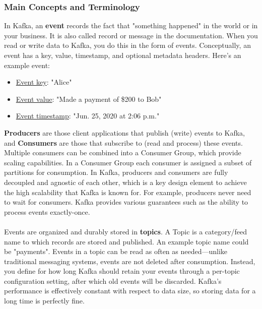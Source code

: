\documentclass[10pt,a4paper]{article}
\newcommand{\nline}{\\~\\}
\begin{document}
\subsubsection{Main Concepts and Terminology}
In Kafka, an \textbf{event} records the fact that "something happened" in the world or in your business. It is also called record or message in the documentation. When you read or write data to Kafka, you do this in the form of events. Conceptually, an event has a key, value, timestamp, and optional metadata headers. Here's an example event:
\begin{itemize}
	\item \uline{Event key}: "Alice"
	\item \uline{Event value}: "Made a payment of \$200 to Bob"
	\item \uline{Event timestamp}: "Jun. 25, 2020 at 2:06 p.m."
\end{itemize}
\textbf{Producers} are those client applications that publish (write) events to Kafka, and \textbf{Consumers} are those that subscribe to (read and process) these events. Multiple consumers can be combined into a Consumer Group, which provide scaling capabilities. In a Consumer Group each consumer is assigned a subset of partitions for consumption. In Kafka, producers and consumers are fully decoupled and agnostic of each other, which is a key design element to achieve the high scalability that Kafka is known for. For example, producers never need to wait for consumers. Kafka provides various guarantees such as the ability to process events exactly-once.
\nline
Events are organized and durably stored in \textbf{topics}. A Topic is a category/feed name to which records are stored and published. An example topic name could be "payments".  Events in a topic can be read as often as needed—unlike traditional messaging systems, events are not deleted after consumption. Instead, you define for how long Kafka should retain your events through a per-topic configuration setting, after which old events will be discarded. Kafka's performance is effectively constant with respect to data size, so storing data for a long time is perfectly fine.
\nline
\end{document}
